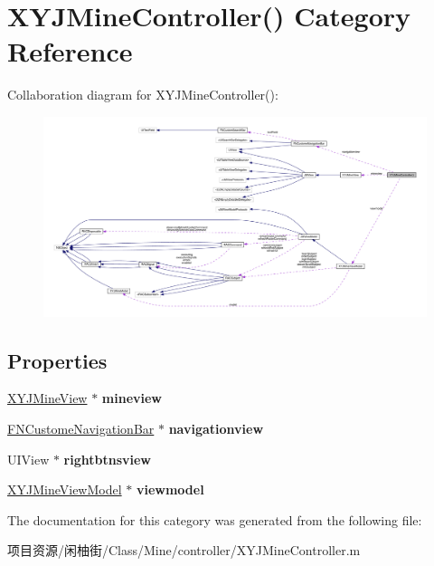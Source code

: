 \hypertarget{category_x_y_j_mine_controller_07_08}{}\section{X\+Y\+J\+Mine\+Controller() Category Reference}
\label{category_x_y_j_mine_controller_07_08}


Collaboration diagram for X\+Y\+J\+Mine\+Controller()\+:\nopagebreak
\begin{figure}[H]
\begin{center}
\leavevmode
\includegraphics[width=350pt]{category_x_y_j_mine_controller_07_08__coll__graph}
\end{center}
\end{figure}
\subsection*{Properties}
\begin{DoxyCompactItemize}
\item 
\mbox{\label{category_x_y_j_mine_controller_07_08_af4a5c9ed0deaf39a1d8a7acbab3dbbda}} 
\mbox{\hyperlink{interface_x_y_j_mine_view}{X\+Y\+J\+Mine\+View}} $\ast$ {\bfseries mineview}
\item 
\mbox{\label{category_x_y_j_mine_controller_07_08_ad8cd2eb72e4955005f4874ad61869925}} 
\mbox{\hyperlink{interface_f_n_custome_navigation_bar}{F\+N\+Custome\+Navigation\+Bar}} $\ast$ {\bfseries navigationview}
\item 
\mbox{\label{category_x_y_j_mine_controller_07_08_a5148031df516d81692961c7cbb8ac7e4}} 
U\+I\+View $\ast$ {\bfseries rightbtnsview}
\item 
\mbox{\label{category_x_y_j_mine_controller_07_08_a74be37a1b4dae78e726c8c5631efab8b}} 
\mbox{\hyperlink{interface_x_y_j_mine_view_model}{X\+Y\+J\+Mine\+View\+Model}} $\ast$ {\bfseries viewmodel}
\end{DoxyCompactItemize}


The documentation for this category was generated from the following file\+:\begin{DoxyCompactItemize}
\item 
项目资源/闲柚街/\+Class/\+Mine/controller/X\+Y\+J\+Mine\+Controller.\+m\end{DoxyCompactItemize}
